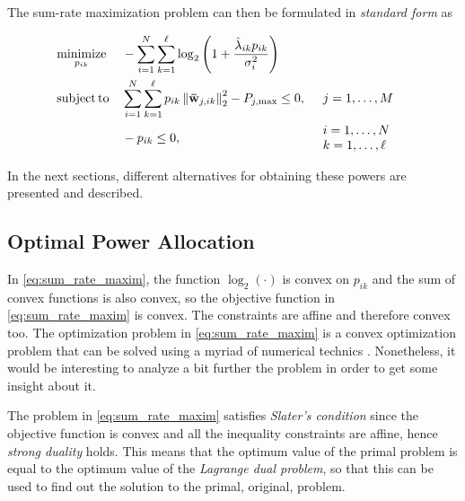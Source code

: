 The sum-rate maximization problem can then be formulated in \emph{standard form}
\cite{boyd_convex} as

\begin{equation} \label{eq:sum_rate_maxim}
\begin{aligned}
	&\operatorname*{minimize}\limits_{p_{ik}} &&-\sum\limits_{i = 1}^N
	\sum\limits_{k = 1}^\ell \log_2\left( 1 +
	\frac{\hat{\lambda}_{ik} p_{ik}}{\sigma_i^2} \right)\\
	&\operatorname*{subject\,to} &&\sum\limits_{i = 1}^N \sum\limits_{k = 1}^\ell p_{ik} \left\|
	\mathbf{\bar{w}}_{j,ik} \right\|_2^2 - P_{j,\max} \leq 0, &&
    \begin{array}{l}
        j = 1, \ldots, M
    \end{array}\\
    & &&-p_{ik} \leq 0, &&
	\begin{array}{l}
        i = 1, \ldots, N\\
        k = 1, \ldots, \ell
	\end{array}
\end{aligned}
\end{equation}

In the next sections, different alternatives for obtaining these powers are
presented and described.

\subsection{Optimal Power Allocation}\label{ssec:optimal_power_allocation}

In \eqref{eq:sum_rate_maxim}, the function $\log_2(\cdot)$ is convex on $p_{ik}$
 and the sum of convex functions is also convex, so the objective function in
\eqref{eq:sum_rate_maxim} is convex. The constraints are affine and therefore
convex too. The optimization problem in \eqref{eq:sum_rate_maxim} is a convex
optimization problem that can be solved using a myriad of numerical technics
\cite{boyd_convex}. Nonetheless, it would be interesting to analyze a bit
further the problem in order to get some insight about it.

The problem in \eqref{eq:sum_rate_maxim} satisfies \emph{Slater's condition}
\cite{boyd_convex} since the objective function is convex and all the
inequality constraints are affine, hence \emph{strong duality} holds. This means
that the optimum value of the primal problem is equal to the optimum value of
the \emph{Lagrange dual problem}, so that this can be used to find out the
solution to the primal, original, problem.

